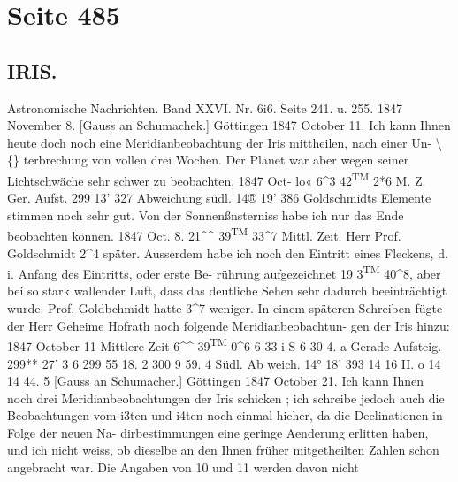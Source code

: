 \documentclass[10pt,a4paper]{article}
\begin{document}
\newpage
\section*{Seite 485}

\subsection*{IRIS.}

Astronomische  Nachrichten.     Band  XXVI.  Nr.  6i6.  Seite  241.  u.  255.     1847  November  8.
[Gauss  an  Schumachek.]     Göttingen  1847  October  11.
Ich  kann  Ihnen  heute  doch  noch  eine  Meridianbeobachtung  der  Iris  mittheilen,  nach  einer  Un-
\textbackslash\{\}     terbrechung  von  vollen  drei  Wochen.     Der  Planet  war  aber  wegen  seiner  Lichtschwäche  sehr  schwer
zu  beobachten.
1847  Oct-  lo«    6\textasciicircum{}3  42\textsuperscript{TM}  2*6  M.  Z.    Ger.  Aufst.  299\glqq{}  13'  32\glqq{}7  Abweichung  südl.  14®  19'  38\glqq{}6
Goldschmidts  Elemente  stimmen  noch  sehr  gut.  Von  der  Sonnenßnsterniss  habe  ich  nur  das  Ende
beobachten  können.
1847  Oct.  8.     21\textasciicircum{}\textasciicircum{}  39\textsuperscript{TM}  33\textasciicircum{}7  Mittl.  Zeit.     Herr  Prof.  Goldschmidt  2\textasciicircum{}4  später.
Ausserdem  habe  ich  noch  den  Eintritt  eines  Fleckens,  d.  i.  Anfang  des  Eintritts,  oder  erste  Be-
rührung aufgezeichnet  19\glqq{}  3\textsuperscript{TM}  40\textasciicircum{}8,  aber  bei  so  stark  wallender  Luft,  dass  das  deutliche  Sehen  sehr
dadurch  beeinträchtigt  wurde.    Prof.  Goldbchmidt  hatte  3\textasciicircum{}7  weniger.
In  einem  späteren  Schreiben  fügte  der  Herr  Geheime  Hofrath  noch  folgende  Meridianbeobachtun-
gen der  Iris  hinzu:
1847
October  11
Mittlere  Zeit
6\textasciicircum{}\textasciicircum{}  39\textsuperscript{TM}  0\textasciicircum{}6
6     33     i-S
6     30     4.  a
Gerade  Aufsteig.
299**  27'     3 \glqq{}6
299  55     18. 2
300  9    59. 4
Südl.  Ab  weich.
14°  18'    39\glqq{}3
14      16      II. o
14     14     44. 5
[Gauss  an  Schumacher.]     Göttingen  1847  October  21.
Ich  kann  Ihnen  noch  drei  Meridianbeobachtungen  der  Iris  schicken ;  ich  schreibe  jedoch  auch  die
Beobachtungen  vom  i3ten  und  i4ten  noch  einmal  hieher,  da  die  Declinationen  in  Folge  der  neuen  Na-
dirbestimmungen eine  geringe  Aenderung  erlitten  haben,  und  ich  nicht  weiss,  ob  dieselbe  an  den  Ihnen
früher  mitgetheilten  Zahlen  schon  angebracht  war.  Die  Angaben  von  10  und  11  werden  davon  nicht
\end{document}
